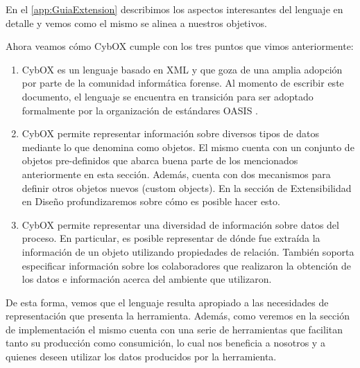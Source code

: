 En el \autoref{app:GuiaExtension} describimos los aspectos interesantes del lenguaje en detalle y vemos como el mismo se alinea a nuestros objetivos.

Ahora veamos cómo CybOX cumple con los tres puntos que vimos anteriormente:

\begin{enumerate}
\item CybOX es un lenguaje basado en XML y que goza de una amplia adopción por parte de la comunidad informática forense. Al momento de escribir este documento, el lenguaje se encuentra en transición para ser adoptado formalmente por la organización de estándares OASIS \cite{stixtrans}.
\item CybOX permite representar información sobre diversos tipos de datos mediante lo que denomina como objetos. El mismo cuenta con un conjunto de objetos pre-definidos que abarca buena parte de los mencionados anteriormente en esta sección. Además, cuenta con dos mecanismos para definir otros objetos nuevos (custom objects). En la sección de Extensibilidad en Diseño profundizaremos sobre cómo es posible hacer esto.
\item CybOX permite representar una diversidad de información sobre datos del proceso. En particular, es posible representar de dónde fue extraída la información de un objeto utilizando propiedades de relación. También soporta especificar información sobre los colaboradores que realizaron la obtención de los datos e información acerca del ambiente que utilizaron.
\end{enumerate}

De esta forma, vemos que el lenguaje resulta apropiado a las necesidades de representación que presenta la herramienta. Además, como veremos en la sección de implementación el mismo cuenta con una serie de herramientas \cite{cyboxpry} que facilitan tanto su producción como consumición, lo cual nos beneficia a nosotros y a quienes deseen utilizar los datos producidos por la herramienta.
